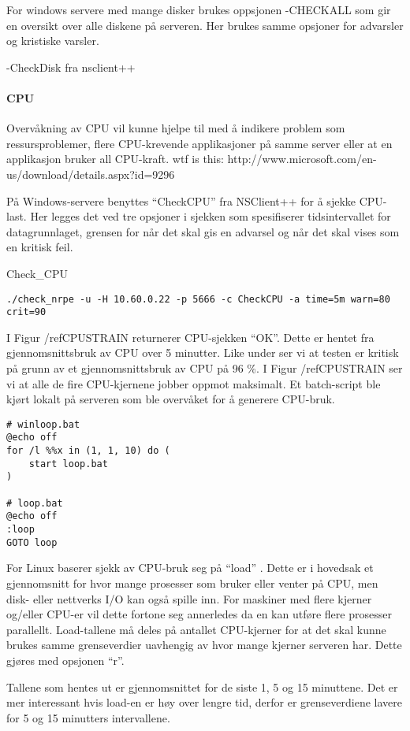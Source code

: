 For windows servere med mange disker brukes oppsjonen -CHECKALL som gir en oversikt over alle diskene på serveren. Her brukes samme opsjoner for advarsler og kristiske varsler.

-CheckDisk fra nsclient++

\paragraph{CPU}

Overvåkning av CPU vil kunne hjelpe til med å indikere problem som ressursproblemer, flere CPU-krevende applikasjoner på samme server eller at en applikasjon bruker all CPU-kraft.  
wtf is this: http://www.microsoft.com/en-us/download/details.aspx?id=9296


På Windows-servere benyttes “CheckCPU” fra NSClient++ for å sjekke CPU-last. Her legges det ved tre opsjoner i sjekken som spesifiserer tidsintervallet for datagrunnlaget, grensen for når det skal gis en advarsel og når det skal vises som en kritisk feil.

Check\_CPU
\begin{lstlisting}
./check_nrpe -u -H 10.60.0.22 -p 5666 -c CheckCPU -a time=5m warn=80 crit=90
\end{lstlisting}
I Figur /ref{CPUSTRAIN} returnerer CPU-sjekken “OK”. Dette er hentet fra gjennomsnittsbruk av CPU over 5 minutter. Like under ser vi at testen er kritisk på grunn av et gjennomsnittsbruk av CPU på 96 \%. I Figur /ref{CPUSTRAIN} ser vi at alle de fire CPU-kjernene jobber oppmot maksimalt. Et batch-script ble kjørt lokalt på serveren som ble overvåket for å generere CPU-bruk.
\begin{lstlisting}
# winloop.bat
@echo off
for /l %%x in (1, 1, 10) do (
    start loop.bat
)

# loop.bat
@echo off
:loop
GOTO loop
\end{lstlisting}
For Linux baserer sjekk av CPU-bruk seg på “load” \cite{loadavg} \cite{wiki:loadavg}. Dette er i hovedsak et gjennomsnitt for hvor mange prosesser som bruker eller venter på CPU, men disk- eller nettverks I/O kan også spille inn. For maskiner med flere kjerner og/eller CPU-er vil dette fortone seg annerledes da en kan utføre flere prosesser parallellt. Load-tallene må deles på antallet CPU-kjerner for at det skal kunne brukes samme grenseverdier uavhengig av hvor mange kjerner serveren har. Dette gjøres med opsjonen “r”.

Tallene som hentes ut er gjennomsnittet for de siste 1, 5 og 15 minuttene. Det er mer interessant hvis load-en er høy over lengre tid, derfor er grenseverdiene lavere for 5 og 15 minutters intervallene.

